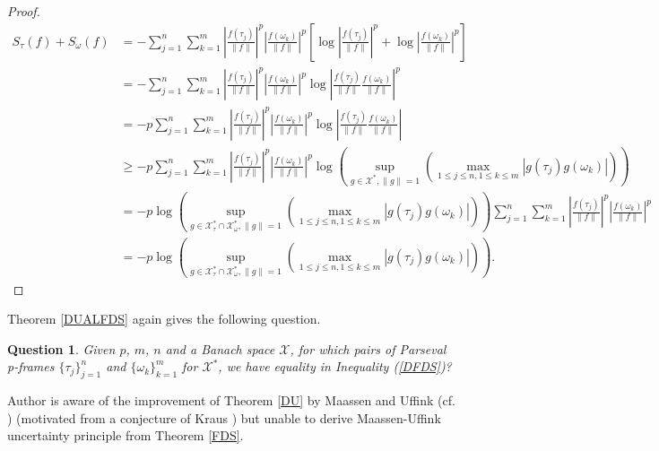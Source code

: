 \documentclass{amsart}
\newtheorem{question}[theorem]{Question}
\begin{document}
\begin{proof}
\begin{align*}
		S_\tau (f)+S_\omega (f)&=-\sum_{j=1}^n\sum_{k=1}^m\left|\frac{f(\tau_j)}{\|f\|}\right|^p\left|\frac{f(\omega_k)}{\|f\|}\right|^p\left[\log \left|\frac{f(\tau_j)}{\|f\|}\right|^p+\log \left|\frac{f(\omega_k)}{\|f\|}\right|^p\right]\\
		&=-\sum_{j=1}^n\sum_{k=1}^m\left|\frac{f(\tau_j)}{\|f\|}\right|^p\left|\frac{f(\omega_k)}{\|f\|}\right|^p\log \left|\frac{f(\tau_j)}{\|f\|}\frac{f(\omega_k)}{\|f\|}\right|^p\\
		&=-p\sum_{j=1}^n\sum_{k=1}^m\left|\frac{f(\tau_j)}{\|f\|}\right|^p\left|\frac{f(\omega_k)}{\|f\|}\right|^p\log \left|\frac{f(\tau_j)}{\|f\|}\frac{f(\omega_k)}{\|f\|}\right|\\
		&\geq -p \sum_{j=1}^n\sum_{k=1}^m\left|\frac{f(\tau_j)}{\|f\|}\right|^p\left|\frac{f(\omega_k)}{\|f\|}\right|^p\log \left(\displaystyle\sup_{g \in \mathcal{X}^*, \|g\|=1}\left(\max_{1\leq j\leq n, 1\leq k\leq m}|g(\tau_j)g(\omega_k)|\right)\right)\\
		&=-p\log \left(\displaystyle\sup_{g \in \mathcal{X}^*_\tau \cap \mathcal{X}^*_\omega, \|g\|=1}\left(\max_{1\leq j\leq n, 1\leq k\leq m}|g(\tau_j)g(\omega_k)|\right)\right)\sum_{j=1}^n\sum_{k=1}^m\left|\frac{f(\tau_j)}{\|f\|}\right|^p\left|\frac{f(\omega_k)}{\|f\|}\right|^p\\
		&=-p\log \left(\displaystyle\sup_{g \in \mathcal{X}^*_\tau \cap \mathcal{X}^*_\omega, \|g\|=1}\left(\max_{1\leq j\leq n, 1\leq k\leq m}|g(\tau_j)g(\omega_k)|\right)\right).
\end{align*}
\end{proof}
Theorem  \ref{DUALFDS}  again gives the following question.
\begin{question}
	Given $p$, $m$, $n$ and a Banach space $\mathcal{X}$, for which pairs of Parseval p-frames $\{\tau_j\}_{j=1}^n$ and $\{\omega_k\}_{k=1}^m$ for $\mathcal{X}^*$, we have equality in Inequality (\ref{DFDS})?
\end{question}
Author is aware of the improvement of Theorem \ref{DU} by Maassen and Uffink \cite{MAASSENUFFINK}  (cf. \cite{DEMBOCOVERTHOMAS}) (motivated from a conjecture of Kraus \cite{KRAUS}) but unable to derive Maassen-Uffink uncertainty principle from Theorem \ref{FDS}.
\end{document}
